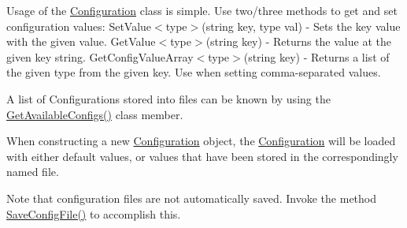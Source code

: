 Usage of the \hyperlink{class_m_b_c_1_1_core_1_1_configuration}{Configuration} class is simple. Use two/three methods to get and set configuration values\-: Set\-Value$<$type$>$(string key, type val) -\/ Sets the key value with the given value. Get\-Value$<$type$>$(string key) -\/ Returns the value at the given key string. Get\-Config\-Value\-Array$<$type$>$(string key) -\/ Returns a list of the given type from the given key. Use when setting comma-\/separated values.

A list of Configurations stored into files can be known by using the \hyperlink{class_m_b_c_1_1_core_1_1_configuration_a6b5833220d539c7b7e48863659bd1cde}{Get\-Available\-Configs()} class member.

When constructing a new \hyperlink{class_m_b_c_1_1_core_1_1_configuration}{Configuration} object, the \hyperlink{class_m_b_c_1_1_core_1_1_configuration}{Configuration} will be loaded with either default values, or values that have been stored in the correspondingly named file.

Note that configuration files are not automatically saved. Invoke the method \hyperlink{class_m_b_c_1_1_core_1_1_configuration_a04f21c72d510c6486acfc8c27fdc34ce}{Save\-Config\-File()} to accomplish this. 

